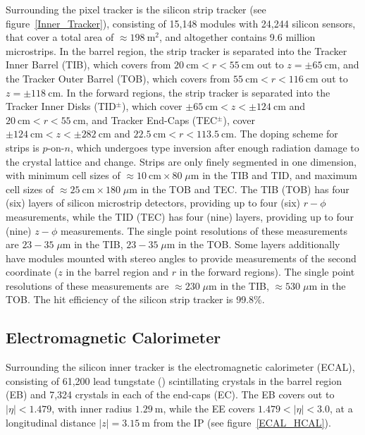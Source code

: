 Surrounding the pixel tracker is the silicon strip tracker (see figure~\ref{Inner_Tracker}), consisting of 15,148 modules with 24,244 silicon sensors, that cover a total area of $\approx \SI{198}{\m \squared}$, and altogether contains 9.6 million microstrips.
In the barrel region, the strip tracker is separated into the Tracker Inner Barrel (TIB), which covers from $\SI{20}{\cm} < r < \SI{55}{\cm}$ out to $z = \pm \SI{65}{\cm}$, and the Tracker Outer Barrel (TOB), which covers from $\SI{55}{\cm} < r < \SI{116}{\cm}$ out to $z = \pm \SI{118}{\cm}$.
In the forward regions, the strip tracker is separated into the Tracker Inner Disks (TID$^\pm$), which cover $\pm\SI{65}{\cm} < z < \pm\SI{124}{\cm}$ and $\SI{20}{\cm} < r < \SI{55}{\cm}$, and Tracker End-Caps (TEC$^\pm$), cover $\pm\SI{124}{\cm} < z < \pm\SI{282}{\cm}$ and $\SI{22.5}{\cm} < r < \SI{113.5}{\cm}$.
The doping scheme for strips is $p$-on-$n$, which undergoes type inversion after enough radiation damage to the crystal lattice and change.
Strips are only finely segmented in one dimension, with minimum cell sizes of  $\approx \SI{10}{\cm} \times 80 \; \mu \si{\m}$ in the TIB and TID, and maximum cell sizes of $\approx \SI{25}{\cm} \times 180 \; \mu \si{\m}$ in the TOB and TEC.
The TIB (TOB) has four (six) layers of silicon microstrip detectors, providing up to four (six) $r-\phi$ measurements, while the TID (TEC) has four (nine) layers, providing up to four (nine) $z-\phi$ measurements.
The single point resolutions of these measurements are $23-35 \; \mu \si{\m}$ in the TIB, $23-35 \; \mu \si{\m}$ in the TOB.
Some layers additionally have modules mounted with stereo angles to provide measurements of the second coordinate ($z$ in the barrel region and $r$ in the forward regions).
The single point resolutions of these measurements are $\approx 230 \; \mu \si{\m}$ in the TIB, $\approx 530 \; \mu \si{\m}$ in the TOB.
The hit efficiency of the silicon strip tracker is 99.8\%.

\subsection{Electromagnetic Calorimeter}
Surrounding the silicon inner tracker is the electromagnetic calorimeter (ECAL), consisting of 61,200 lead tungstate () scintillating crystals in the barrel region (EB) and 7,324 crystals in each of the end-caps (EC).
The EB covers out to $\vert \eta \vert < 1.479$, with inner radius $\SI{1.29}{\m}$, while the EE covers $1.479 < \vert \eta \vert < 3.0$, at a longitudinal distance $\vert z \vert = \SI{3.15}{\m}$ from the IP (see figure~\ref{ECAL_HCAL}).

